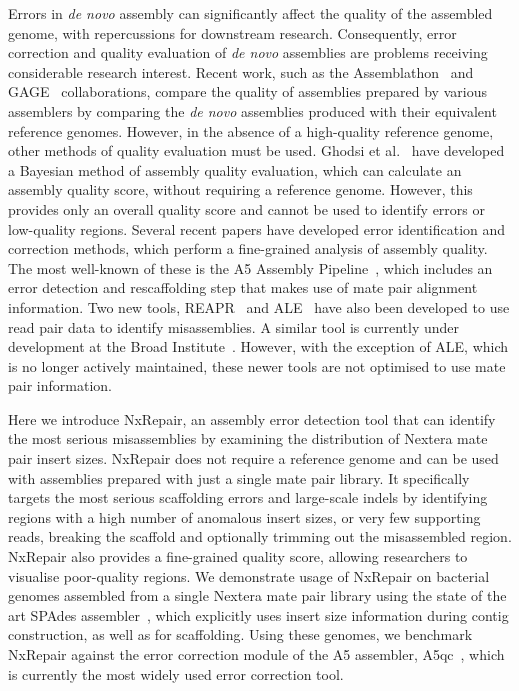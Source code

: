 \documentclass[fleqn,10pt]{wlpeerj}
\begin{document}
Errors in \textit{de novo} assembly can significantly affect the quality of the assembled genome, with repercussions for downstream research. Consequently, error correction and quality evaluation of \textit{de novo} assemblies are problems receiving considerable research interest. Recent work, such as the Assemblathon~\citep{Bradnam2013} and GAGE~\citep{Salzberg2012} collaborations, compare the quality of assemblies prepared by various assemblers by comparing the \textit{de novo} assemblies produced with their equivalent reference genomes. However, in the absence of a high-quality reference genome, other methods of quality evaluation must be used. Ghodsi et al.~\citep{Ghodsi2013} have developed a Bayesian method of assembly quality evaluation, which can calculate an assembly quality score, without requiring a reference genome. However, this provides only an overall quality score and cannot be used to identify errors or low-quality regions. Several recent papers have developed error identification and correction methods, which perform a fine-grained analysis of assembly quality. The most well-known of these is the A5 Assembly Pipeline~\citep{Coil2014, tritt2012}, which includes an error detection and rescaffolding step that makes use of mate pair alignment information. Two new tools, REAPR~\citep{Hunt2013} and ALE~\citep{Clark2013} have also been developed to use read pair data to identify misassemblies. A similar tool is currently under development at the Broad Institute~\citep{pilon2014}. However, with the exception of ALE, which is no longer actively maintained, these newer tools are not optimised to use mate pair information.  

Here we introduce NxRepair, an assembly error detection tool that can identify the most serious misassemblies by examining the distribution of Nextera mate pair insert sizes. NxRepair does not require a reference genome and can be used with assemblies prepared with just a single mate pair library. It specifically targets the most serious scaffolding errors and large-scale indels by identifying regions with a high number of anomalous insert sizes, or very few supporting reads, breaking the scaffold and optionally trimming out the misassembled region. NxRepair also provides a fine-grained quality score, allowing researchers to visualise poor-quality regions. We demonstrate usage of NxRepair on bacterial genomes assembled from a single Nextera mate pair library using the state of the art SPAdes assembler~\citep{Bankevich2012}, which explicitly uses insert size information during contig construction, as well as for scaffolding. Using these genomes, we benchmark NxRepair against the error correction module of the A5 assembler, A5qc~\citep{tritt2012}, which is currently the most widely used error correction tool.
\end{document}
